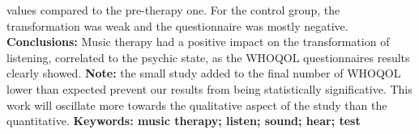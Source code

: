 values compared to the pre-therapy one.
For the control group, the transformation was weak and the questionnaire was mostly negative.
\textbf{Conclusions:} Music therapy had a positive impact on the transformation of listening, correlated 
to the psychic state, as the WHOQOL questionnaires results clearly showed.
\textbf{Note:} the small study added to the final number of WHOQOL lower than expected prevent our 
results from being statistically 
significative.
This work will oscillate more 
towards the qualitative aspect of the study than the quantitative.
\textbf{Keywords: music therapy; listen; sound; hear; test}













